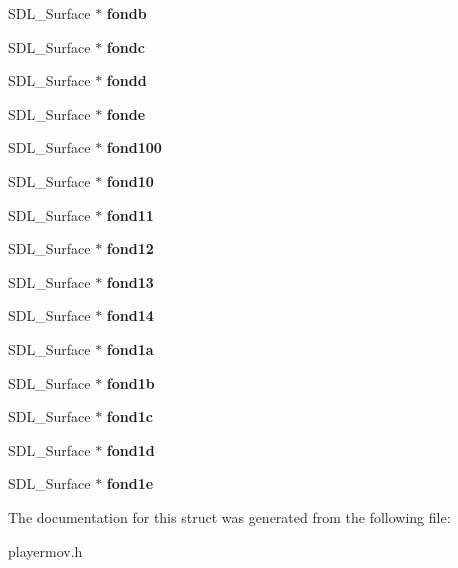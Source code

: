 \begin{DoxyCompactItemize}
S\+D\+L\+\_\+\+Surface $\ast$ {\bfseries fondb}
\item 
\mbox{\label{structperso_ac022be57eda44dffb7cd61238105d829}} 
S\+D\+L\+\_\+\+Surface $\ast$ {\bfseries fondc}
\item 
\mbox{\label{structperso_a9a772db6d232ee2cb2ebbd7cb6eefd27}} 
S\+D\+L\+\_\+\+Surface $\ast$ {\bfseries fondd}
\item 
\mbox{\label{structperso_af154dd32419382fa953b8f8d330fe2d8}} 
S\+D\+L\+\_\+\+Surface $\ast$ {\bfseries fonde}
\item 
\mbox{\label{structperso_a40e60201cc8c1ad4c931edfa4e2a2cc4}} 
S\+D\+L\+\_\+\+Surface $\ast$ {\bfseries fond100}
\item 
\mbox{\label{structperso_abd927488ba668da20c112f59600889df}} 
S\+D\+L\+\_\+\+Surface $\ast$ {\bfseries fond10}
\item 
\mbox{\label{structperso_a5abd4aa13a7cf46316695b9495506ae6}} 
S\+D\+L\+\_\+\+Surface $\ast$ {\bfseries fond11}
\item 
\mbox{\label{structperso_a2629bfca81fbdb026808089d1187d9e3}} 
S\+D\+L\+\_\+\+Surface $\ast$ {\bfseries fond12}
\item 
\mbox{\label{structperso_a51dce8a497f1db9e12b0b3ee71af0052}} 
S\+D\+L\+\_\+\+Surface $\ast$ {\bfseries fond13}
\item 
\mbox{\label{structperso_aa443157f867f36b10393249eab1e75c8}} 
S\+D\+L\+\_\+\+Surface $\ast$ {\bfseries fond14}
\item 
\mbox{\label{structperso_af858d71938dbfee462d9bc08fb0f73fb}} 
S\+D\+L\+\_\+\+Surface $\ast$ {\bfseries fond1a}
\item 
\mbox{\label{structperso_a8997d65f260f4e1f11e7ebb8baf648a0}} 
S\+D\+L\+\_\+\+Surface $\ast$ {\bfseries fond1b}
\item 
\mbox{\label{structperso_a66008ae563d914b2f481013048ac6c70}} 
S\+D\+L\+\_\+\+Surface $\ast$ {\bfseries fond1c}
\item 
\mbox{\label{structperso_a53e0228ff9182d11f46bc9b6f8a8db45}} 
S\+D\+L\+\_\+\+Surface $\ast$ {\bfseries fond1d}
\item 
\mbox{\label{structperso_a84a44aa8246852dbcf90911cde41654e}} 
S\+D\+L\+\_\+\+Surface $\ast$ {\bfseries fond1e}
\end{DoxyCompactItemize}


The documentation for this struct was generated from the following file\+:\begin{DoxyCompactItemize}
\item 
playermov.\+h\end{DoxyCompactItemize}
